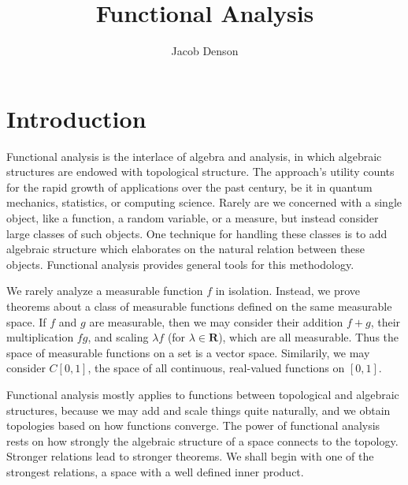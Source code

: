 

\title{Functional Analysis}
\author{Jacob Denson}



\maketitle
\tableofcontents
{}

\chapter{Introduction}

Functional analysis is the interlace of algebra and analysis, in which algebraic structures are endowed with topological structure. The approach's utility counts for the rapid growth of applications over the past century, be it in quantum mechanics, statistics, or computing science. Rarely are we concerned with a single object, like a function, a random variable, or a measure, but instead consider large classes of such objects. One technique for handling these classes is to add algebraic structure which elaborates on the natural relation between these objects. Functional analysis provides general tools for this methodology.

\begin{example}
    We rarely analyze a measurable function $f$ in isolation. Instead, we prove theorems about a class of measurable functions defined on the same measurable space. If $f$ and $g$ are measurable, then we may consider their addition $f + g$, their multiplication $fg$, and scaling $\lambda f$ (for $\lambda \in \mathbf{R}$), which are all measurable. Thus the space of measurable functions on a set is a vector space. Similarily, we may consider $C[0,1]$, the space of all continuous, real-valued functions on $[0,1]$.
\end{example}

Functional analysis mostly applies to functions between topological and algebraic structures, because we may add and scale things quite naturally, and we obtain topologies based on how functions converge. The power of functional analysis rests on how strongly the algebraic structure of a space connects to the topology. Stronger relations lead to stronger theorems. We shall begin with one of the strongest relations, a space with a well defined inner product.

